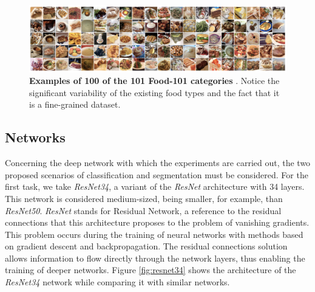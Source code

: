 \begin{figure}
    \centering
    \includegraphics[width=1\textwidth]{Pictures/food101.png} 
    \caption{\textbf{Examples of 100 of the 101 Food-101 categories} \cite{bossard14}. Notice the significant variability of the existing food types and the fact that it is a fine-grained dataset.}
    \label{fig:food101}
\end{figure}

\subsection{Networks}
Concerning the deep network with which the experiments are carried out, the two proposed scenarios of classification and segmentation must be considered. For the first task, we take \textit{ResNet34}, a variant of the \textit{ResNet} architecture \cite{he2016deep} with 34 layers. This network is considered medium-sized, being smaller, for example, than \textit{ResNet50}. \textit{ResNet} stands for Residual Network, a reference to the residual connections that this architecture proposes to the problem of vanishing gradients. This problem occurs during the training of neural networks with methods based on gradient descent and backpropagation. The residual connections solution allows information to flow directly through the network layers, thus enabling the training of deeper networks. Figure \ref{fig:resnet34} shows the architecture of the \textit{ResNet34} network while comparing it with similar networks.

